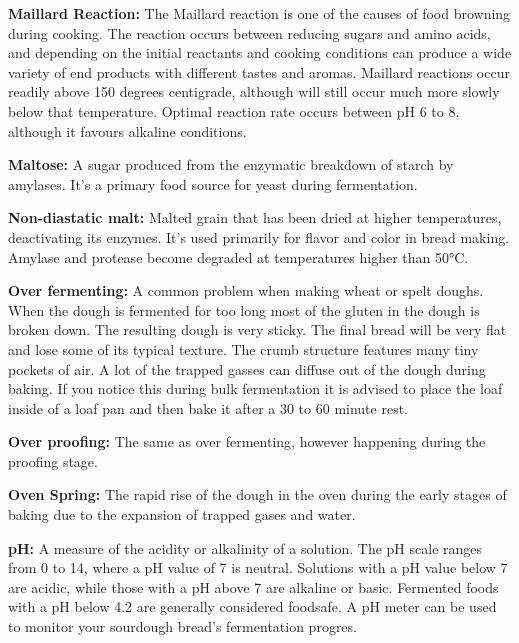 \textbf{Maillard Reaction:} The Maillard reaction is one of the causes of food browning
during cooking. The reaction occurs between reducing sugars and amino acids, and
depending on the initial reactants and cooking conditions can produce a wide variety
of end products with different tastes and aromas. Maillard reactions occur readily
above 150 degrees centigrade, although will still occur much more slowly below that
temperature. Optimal reaction rate occurs between pH 6 to 8, although it favours
alkaline conditions.

\textbf{Maltose:} A sugar produced from the enzymatic breakdown of starch by amylases.
It's a primary food source for yeast during fermentation.

\textbf{Non-diastatic malt:} Malted grain that has been dried at higher temperatures,
deactivating its enzymes. It's used primarily for flavor and color in bread making.
Amylase and protease become degraded at temperatures higher than 50°C.

\textbf{Over fermenting:} A common problem when making wheat or spelt doughs. When the
dough is fermented for too long most of the gluten in the dough is broken down. The
resulting dough is very sticky. The final bread will be very flat and lose some of its
typical texture. The crumb structure features many tiny pockets of air. A lot of the
trapped gasses can diffuse out of the dough during baking. If you notice this during
bulk fermentation it is advised to place the loaf inside of a loaf pan and then bake
it after a 30 to 60 minute rest.

\textbf{Over proofing:} The same as over fermenting, however happening during the
proofing stage.

\textbf{Oven Spring:} The rapid rise of the dough in the oven during the early stages
of baking due to the expansion of trapped gases and water.

\textbf{pH:} A measure of the acidity or alkalinity of a solution. The pH scale
ranges from 0 to 14, where a pH value of 7 is neutral. Solutions with a pH value below
7 are acidic, while those with a pH above 7 are alkaline or basic. Fermented
foods with a pH below 4.2 are generally considered foodsafe. A pH meter can be
used to monitor your sourdough bread's fermentation progres.

